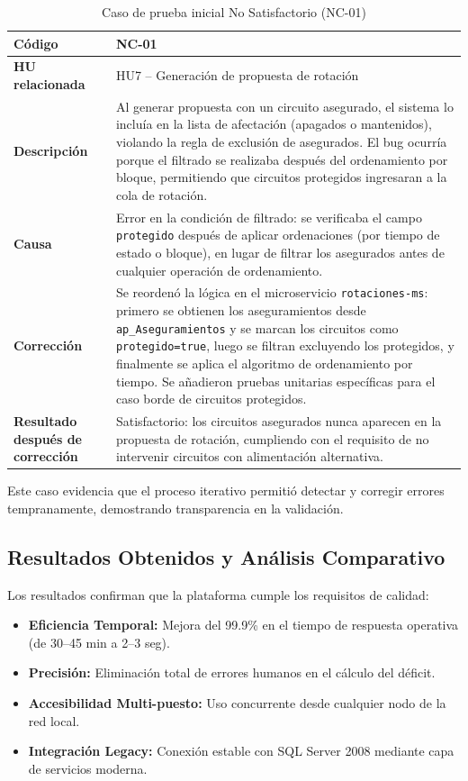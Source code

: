 \begin{table}[H]
\centering
\caption{Caso de prueba inicial No Satisfactorio (NC-01)}
\label{tab:nc_ejemplo}
\begin{tabular}{|l|p{8cm}|}
\hline
\textbf{Código} & NC-01 \\
\hline
\textbf{HU relacionada} & HU7 – Generación de propuesta de rotación \\
\hline
\textbf{Descripción} & Al generar propuesta con un circuito asegurado, el sistema lo incluía en la lista de afectación (apagados o mantenidos), violando la regla de exclusión de asegurados. El bug ocurría porque el filtrado se realizaba después del ordenamiento por bloque, permitiendo que circuitos protegidos ingresaran a la cola de rotación. \\
\hline
\textbf{Causa} & Error en la condición de filtrado: se verificaba el campo \texttt{protegido} después de aplicar ordenaciones (por tiempo de estado o bloque), en lugar de filtrar los asegurados antes de cualquier operación de ordenamiento. \\
\hline
\textbf{Corrección} & Se reordenó la lógica en el microservicio \texttt{rotaciones-ms}: primero se obtienen los aseguramientos desde \texttt{ap\_Aseguramientos} y se marcan los circuitos como \texttt{protegido=true}, luego se filtran excluyendo los protegidos, y finalmente se aplica el algoritmo de ordenamiento por tiempo. Se añadieron pruebas unitarias específicas para el caso borde de circuitos protegidos. \\
\hline
\textbf{Resultado después de corrección} & Satisfactorio: los circuitos asegurados nunca aparecen en la propuesta de rotación, cumpliendo con el requisito de no intervenir circuitos con alimentación alternativa. \\
\hline
\end{tabular}
\end{table}

Este caso evidencia que el proceso iterativo permitió detectar y corregir errores tempranamente, demostrando transparencia en la validación.

\subsection{Resultados Obtenidos y Análisis Comparativo}

Los resultados confirman que la plataforma cumple los requisitos de calidad:

\begin{itemize}
    \item \textbf{Eficiencia Temporal:} Mejora del 99.9\% en el tiempo de respuesta operativa (de 30–45 min a 2–3 seg).
    \item \textbf{Precisión:} Eliminación total de errores humanos en el cálculo del déficit.
    \item \textbf{Accesibilidad Multi-puesto:} Uso concurrente desde cualquier nodo de la red local.
    \item \textbf{Integración Legacy:} Conexión estable con SQL Server 2008 mediante capa de servicios moderna.
\end{itemize}

